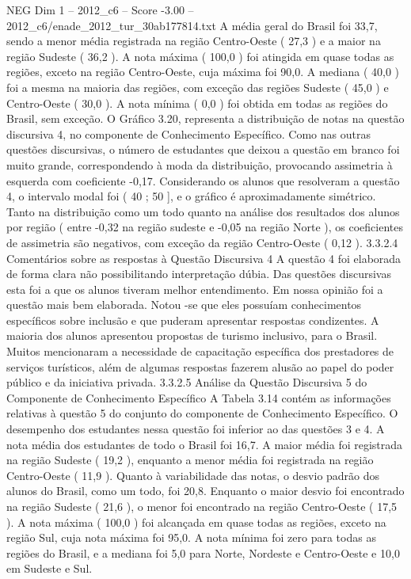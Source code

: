 \begin{textsample}{NEG Dim 1 – 2012\_c6 – Score -3.00 – 2012\_c6/enade\_2012\_tur\_30ab177814.txt}
A média geral do Brasil foi 33,7, sendo a menor média registrada na região Centro-Oeste ( 27,3 ) e a maior na região Sudeste ( 36,2 ).
A nota máxima ( 100,0 ) foi atingida em quase todas as regiões, exceto na região Centro-Oeste, cuja máxima foi 90,0.
A mediana ( 40,0 ) foi a mesma na maioria das regiões, com exceção das regiões Sudeste ( 45,0 ) e Centro-Oeste ( 30,0 ).
A nota mínima ( 0,0 ) foi obtida em todas as regiões do Brasil, sem exceção.
O Gráfico 3.20, representa a distribuição de notas na questão discursiva 4, no componente de Conhecimento Específico.
Como nas outras questões discursivas, o número de estudantes que deixou a questão em branco foi muito grande, correspondendo à moda da distribuição, provocando assimetria à esquerda com coeficiente -0,17.
Considerando os alunos que resolveram a questão 4, o intervalo modal foi ( 40 ; 50 ], e o gráfico é aproximadamente simétrico.
Tanto na distribuição como um todo quanto na análise dos resultados dos alunos por região ( entre -0,32 na região sudeste e -0,05 na região Norte ), os coeficientes de assimetria são negativos, com exceção da região Centro-Oeste ( 0,12 ). 3.3.2.4 Comentários sobre as respostas à Questão Discursiva 4 A questão 4 foi elaborada de forma clara não possibilitando interpretação dúbia.
Das questões discursivas esta foi a que os alunos tiveram melhor entendimento.
Em nossa opinião foi a questão mais bem elaborada.
Notou -se que eles possuíam conhecimentos específicos sobre inclusão e que puderam apresentar respostas condizentes.
A maioria dos alunos apresentou propostas de turismo inclusivo, para o Brasil.
Muitos mencionaram a necessidade de capacitação específica dos prestadores de serviços turísticos, além de algumas respostas fazerem alusão ao papel do poder público e da iniciativa privada. 3.3.2.5 Análise da Questão Discursiva 5 do Componente de Conhecimento Específico A Tabela 3.14 contém as informações relativas à questão 5 do conjunto do componente de Conhecimento Específico.
O desempenho dos estudantes nessa questão foi inferior ao das questões 3 e 4.
A nota média dos estudantes de todo o Brasil foi 16,7.
A maior média foi registrada na região Sudeste ( 19,2 ), enquanto a menor média foi registrada na região Centro-Oeste ( 11,9 ).
Quanto à variabilidade das notas, o desvio padrão dos alunos do Brasil, como um todo, foi 20,8.
Enquanto o maior desvio foi encontrado na região Sudeste ( 21,6 ), o menor foi encontrado na região Centro-Oeste ( 17,5 ).
A nota máxima ( 100,0 ) foi alcançada em quase todas as regiões, exceto na região Sul, cuja nota máxima foi 95,0.
A nota mínima foi zero para todas as regiões do Brasil, e a mediana foi 5,0 para Norte, Nordeste e Centro-Oeste e 10,0 em Sudeste e Sul.

\end{textsample}
